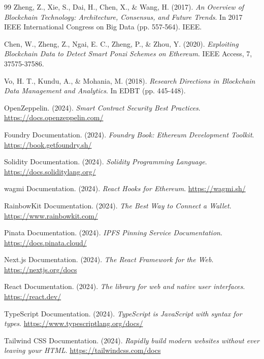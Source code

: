 \begin{thebibliography}{99}
 Zheng, Z., Xie, S., Dai, H., Chen, X., \& Wang, H. (2017). \textit{An Overview of Blockchain Technology: Architecture, Consensus, and Future Trends}. In 2017 IEEE International Congress on Big Data (pp. 557-564). IEEE.

 Chen, W., Zheng, Z., Ngai, E. C., Zheng, P., \& Zhou, Y. (2020). \textit{Exploiting Blockchain Data to Detect Smart Ponzi Schemes on Ethereum}. IEEE Access, 7, 37575-37586.

 Vo, H. T., Kundu, A., \& Mohania, M. (2018). \textit{Research Directions in Blockchain Data Management and Analytics}. In EDBT (pp. 445-448).

 OpenZeppelin. (2024). \textit{Smart Contract Security Best Practices}. \url{https://docs.openzeppelin.com/}

 Foundry Documentation. (2024). \textit{Foundry Book: Ethereum Development Toolkit}. \url{https://book.getfoundry.sh/}

 Solidity Documentation. (2024). \textit{Solidity Programming Language}. \url{https://docs.soliditylang.org/}

 wagmi Documentation. (2024). \textit{React Hooks for Ethereum}. \url{https://wagmi.sh/}

 RainbowKit Documentation. (2024). \textit{The Best Way to Connect a Wallet}. \url{https://www.rainbowkit.com/}

 Pinata Documentation. (2024). \textit{IPFS Pinning Service Documentation}. \url{https://docs.pinata.cloud/}

 Next.js Documentation. (2024). \textit{The React Framework for the Web}. \url{https://nextjs.org/docs}

 React Documentation. (2024). \textit{The library for web and native user interfaces}. \url{https://react.dev/}

 TypeScript Documentation. (2024). \textit{TypeScript is JavaScript with syntax for types}. \url{https://www.typescriptlang.org/docs/}

 Tailwind CSS Documentation. (2024). \textit{Rapidly build modern websites without ever leaving your HTML}. \url{https://tailwindcss.com/docs}

\end{thebibliography}
